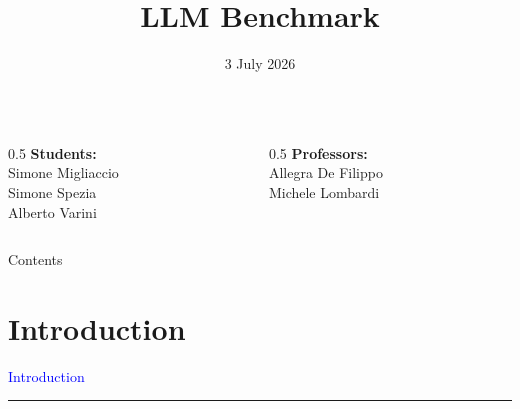 \documentclass{beamer}
\title[LLM Benchmark]{LLM Benchmark}
\date{3 July 2026}
\begin{document}
\begin{frame}
    \titlepage
    \begin{columns}
        
        \begin{column}{0.5\textwidth}
            \centering
            \textbf{Students:}\\
            Simone Migliaccio\\
            Simone Spezia\\
            Alberto Varini
        \end{column}
        
        
        \begin{column}{0.5\textwidth}
            \centering
            \textbf{Professors:}\\
            Allegra De Filippo\\
            Michele Lombardi
        \end{column}
    \end{columns}
\end{frame}

\begin{frame}{Contents}
    \tableofcontents
\end{frame}

\section{Introduction}

\begin{frame}[c]
    \centering
    
    {\Huge\textcolor{blue}{Introduction}}
    
    \vspace{0.1cm} %
    
    \textcolor{black}{\rule{10cm}{1pt}}
    
\end{frame}
\end{document}
